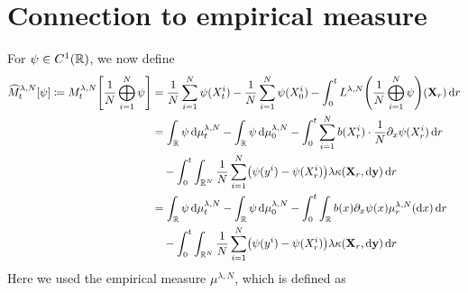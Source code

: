 \section{Connection to empirical measure}

\noindent For \(\psi \in C^1(\mathbb{R})\), we now define
\begin{equation}\label{eq:hat-M-derivation-start}
  \begin{split}
    \widehat{M}_t^{\lambda, N}[\psi] \coloneqq
    M_t^{\lambda, N}\sbr*{\frac{1}{N} \bigoplus_{i=1}^N \psi}
     & = \frac{1}{N} \sum_{i=1}^N \psi(X_t^i) - \frac{1}{N} \sum_{i=1}^N \psi(X_0^i) - \int_0^t L^{\lambda, N} \br*{\frac{1}{N}\bigoplus_{i=1}^N \psi} (\bm{X}_r) \odif{r} \\
     & = \int_\potspace \psi \odif{\mu_t^{\lambda, N}} - \int_\potspace \psi \odif{\mu_0^{\lambda, N}}
    - \int_0^t \sum_{i=1}^N b(X_{r}^i) \cdot \frac{1}{N} \partial_{x} \psi(X_{r}^i) \odif{r}                                                                               \\
     & \quad - \int_0^t \int_{\potspace^N} \frac{1}{N} \sum_{i=1}^N \br*{ \psi(y^i) - \psi(X_{r}^i) } \lambda \kappa(\bm{X}_r, \odif{\bm{y}}) \odif{r}                     \\
     & = \int_\potspace \psi \odif{\mu_t^{\lambda, N}} - \int_\potspace \psi \odif{\mu_0^{\lambda, N}}
    - \int_0^t \int_\potspace b(x) \partial_{x} \psi(x) \mu_r^{\lambda, N}(\odif{x}) \odif{r}                                                                              \\
     & \quad - \int_0^t \int_{\potspace^N} \frac{1}{N} \sum_{i=1}^N \br*{ \psi(y^i) - \psi(X_{r}^i) } \lambda \kappa(\bm{X}_r, \odif{\bm{y}}) \odif{r}                     \\
  \end{split}
\end{equation}
Here we used the empirical measure \(\mu^{\lambda,N}\), which is defined as
